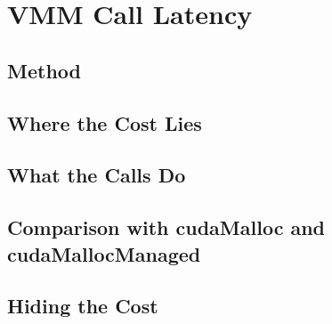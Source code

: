 \section{VMM Call Latency}
\label{sec:latency}

\subsection{Method}

\subsection{Where the Cost Lies}

\subsection{What the Calls Do}

\subsection{Comparison with cudaMalloc and cudaMallocManaged}

\subsection{Hiding the Cost}

